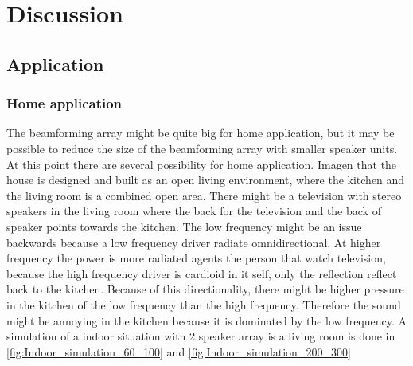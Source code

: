 \chapter{Discussion}



\section{Application}

\subsection{Home application}
The beamforming array might be quite big for home application, but it may be possible to reduce the size of the beamforming array with smaller speaker units. At this point there are several possibility for home application. Imagen that the house is designed and built as an open living environment, where the kitchen and the living room is a combined open area. There might be a television with stereo speakers in the living room where the back for the television and the back of speaker points towards the kitchen. The low frequency might be an issue backwards because a low frequency driver radiate omnidirectional. At higher frequency the power is more radiated agents the person that watch television, because the high frequency driver is cardioid in it self, only the reflection reflect back to the kitchen. Because of this directionality, there might be higher pressure in the kitchen of the low frequency than the high frequency. Therefore the sound might be annoying in the kitchen because it is dominated by the low frequency. A simulation of a indoor situation with 2 speaker array is a living room is done in \autoref{fig:Indoor_simulation_60_100} and \autoref{fig:Indoor_simulation_200_300}
 




